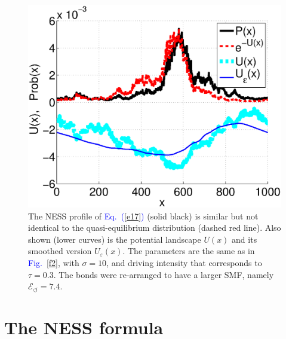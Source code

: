 \documentclass[aps,pre,floats,floatfix,twocolumn]{revtex4}
\newcommand{\Eq}[1]{\textcolor{blue}{Eq.\!\!~(\ref{#1})}}
\newcommand{\Fig}[1]{\textcolor{blue}{Fig.}\!\!~\ref{#1}}
\begin{document}
\begin{figure}
\includegraphics[width=\hsize]{PvsV4}

\caption{
The NESS profile of \Eq{e17} (solid black) 
is similar but not identical to the quasi-equilibrium 
distribution (dashed red line). 
Also shown (lower curves) is the potential landscape $U(x)$ 
and its smoothed version $U_{\varepsilon}(x)$. 
The parameters are the same as in \Fig{f2}, 
with $\sigma=10$, 
and driving intensity that corresponds to $\tau=0.3$.
The bonds were re-arranged to have a larger SMF,
namely $\mathcal{E}_{\circlearrowleft}=7.4$.}

\label{f3}
\end{figure}









\section{The NESS formula}
\label{sec:formula}
\end{document}
